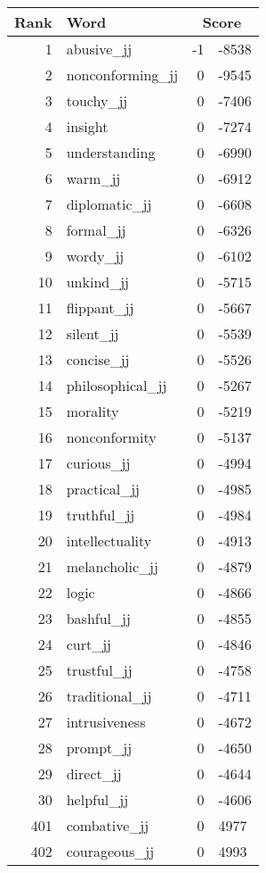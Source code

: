 \begin{longtable}[!htbp]{| rlr@{.}l |}
    \hline
    \textbf{Rank} & \textbf{Word} & \multicolumn{2}{c|}{\textbf{Score}} \\
    \hline
    \endhead
    1 & abusive\_jj & -1 & -8538 \\
    2 & nonconforming\_jj & 0 & -9545 \\
    3 & touchy\_jj & 0 & -7406 \\
    4 & insight & 0 & -7274 \\
    5 & understanding & 0 & -6990 \\
    6 & warm\_jj & 0 & -6912 \\
    7 & diplomatic\_jj & 0 & -6608 \\
    8 & formal\_jj & 0 & -6326 \\
    9 & wordy\_jj & 0 & -6102 \\
    10 & unkind\_jj & 0 & -5715 \\
    11 & flippant\_jj & 0 & -5667 \\
    12 & silent\_jj & 0 & -5539 \\
    13 & concise\_jj & 0 & -5526 \\
    14 & philosophical\_jj & 0 & -5267 \\
    15 & morality & 0 & -5219 \\
    16 & nonconformity & 0 & -5137 \\
    17 & curious\_jj & 0 & -4994 \\
    18 & practical\_jj & 0 & -4985 \\
    19 & truthful\_jj & 0 & -4984 \\
    20 & intellectuality & 0 & -4913 \\
    21 & melancholic\_jj & 0 & -4879 \\
    22 & logic & 0 & -4866 \\
    23 & bashful\_jj & 0 & -4855 \\
    24 & curt\_jj & 0 & -4846 \\
    25 & trustful\_jj & 0 & -4758 \\
    26 & traditional\_jj & 0 & -4711 \\
    27 & intrusiveness & 0 & -4672 \\
    28 & prompt\_jj & 0 & -4650 \\
    29 & direct\_jj & 0 & -4644 \\
    30 & helpful\_jj & 0 & -4606 \\
    401 & combative\_jj & 0 & 4977 \\
    402 & courageous\_jj & 0 & 4993 \\

\end{longtable}

